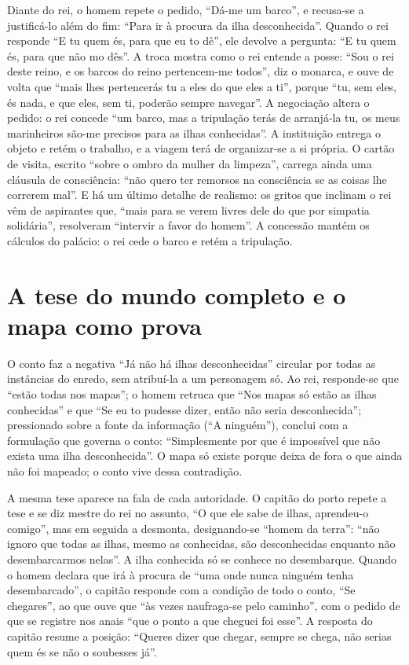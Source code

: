 \documentclass[12pt]{article}
\begin{document}
Diante do rei, o homem repete o pedido, ``Dá-me um barco'', e recusa-se a justificá-lo além do fim: ``Para ir à procura da ilha desconhecida''. Quando o rei responde ``E tu quem és, para que eu to dê'', ele devolve a pergunta: ``E tu quem és, para que não mo dês''. A troca mostra como o rei entende a posse: ``Sou o rei deste reino, e os barcos do reino pertencem-me todos'', diz o monarca, e ouve de volta que ``mais lhes pertencerás tu a eles do que eles a ti'', porque ``tu, sem eles, és nada, e que eles, sem ti, poderão sempre navegar''. A negociação altera o pedido: o rei concede ``um barco, mas a tripulação terás de arranjá-la tu, os meus marinheiros são-me precisos para as ilhas conhecidas''. A instituição entrega o objeto e retém o trabalho, e a viagem terá de organizar-se a si própria. O cartão de visita, escrito ``sobre o ombro da mulher da limpeza'', carrega ainda uma cláusula de consciência: ``não quero ter remorsos na consciência se as coisas lhe correrem mal''. E há um último detalhe de realismo: os gritos que inclinam o rei vêm de aspirantes que, ``mais para se verem livres dele do que por simpatia solidária'', resolveram ``intervir a favor do homem''. A concessão mantém os cálculos do palácio: o rei cede o barco e retém a tripulação.

\section{A tese do mundo completo e o mapa como prova}

O conto faz a negativa ``Já não há ilhas desconhecidas'' circular por todas as instâncias do enredo, sem atribuí-la a um personagem só. Ao rei, responde-se que ``estão todas nos mapas''; o homem retruca que ``Nos mapas só estão as ilhas conhecidas'' e que ``Se eu to pudesse dizer, então não seria desconhecida''; pressionado sobre a fonte da informação (``A ninguém''), conclui com a formulação que governa o conto: ``Simplesmente por que é impossível que não exista uma ilha desconhecida''. O mapa só existe porque deixa de fora o que ainda não foi mapeado; o conto vive dessa contradição.

A mesma tese aparece na fala de cada autoridade. O capitão do porto repete a tese e se diz mestre do rei no assunto, ``O que ele sabe de ilhas, aprendeu-o comigo'', mas em seguida a desmonta, designando-se ``homem da terra'': ``não ignoro que todas as ilhas, mesmo as conhecidas, são desconhecidas enquanto não desembarcarmos nelas''. A ilha conhecida só se conhece no desembarque. Quando o homem declara que irá à procura de ``uma onde nunca ninguém tenha desembarcado'', o capitão responde com a condição de todo o conto, ``Se chegares'', ao que ouve que ``às vezes naufraga-se pelo caminho'', com o pedido de que se registre nos anais ``que o ponto a que cheguei foi esse''. A resposta do capitão resume a posição: ``Queres dizer que chegar, sempre se chega, não serias quem és se não o soubesses já''.
\end{document}
